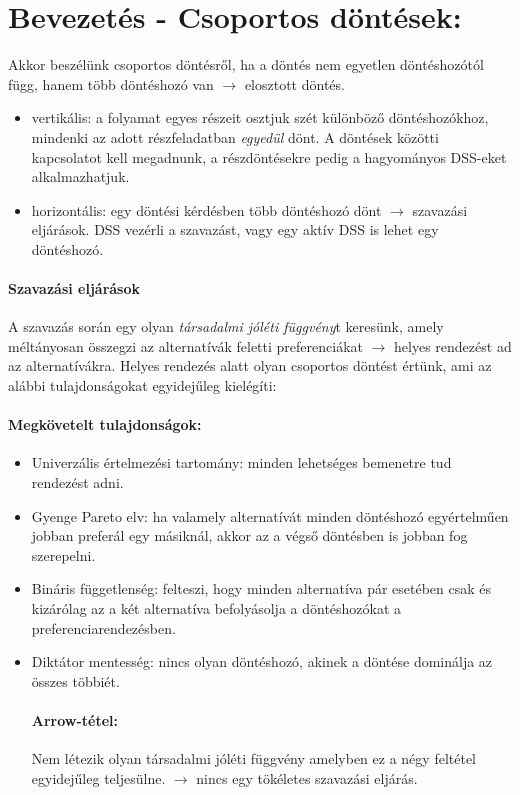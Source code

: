 \documentclass[a4paper,12pt]{article}
\begin{document}
\section{Bevezetés - Csoportos döntések:}

Akkor beszélünk csoportos döntésről, ha a döntés nem egyetlen döntéshozótól függ, hanem több döntéshozó van $\longrightarrow$ elosztott döntés.

\begin{itemize}
\item vertikális: a folyamat egyes részeit osztjuk szét különböző döntéshozókhoz, mindenki az adott részfeladatban \emph{egyedül} dönt. A döntések közötti kapcsolatot kell megadnunk, a részdöntésekre pedig a hagyományos DSS-eket alkalmazhatjuk.

\item horizontális: egy döntési kérdésben több döntéshozó dönt $\longrightarrow$ szavazási eljárások. DSS vezérli a szavazást, vagy egy aktív DSS is lehet egy döntéshozó. 
\end{itemize}

\paragraph{Szavazási eljárások}

A szavazás során egy olyan \emph{társadalmi jóléti függvény}t keresünk, amely méltányosan összegzi az alternatívák feletti preferenciákat $\longrightarrow$ helyes rendezést ad az alternatívákra. Helyes rendezés alatt olyan csoportos döntést értünk, ami az alábbi tulajdonságokat egyidejűleg kielégíti:

\paragraph{Megkövetelt tulajdonságok: }
\begin{itemize}
\item Univerzális értelmezési tartomány: minden lehetséges bemenetre tud rendezést adni.

\item Gyenge Pareto elv: ha valamely alternatívát minden döntéshozó egyértelműen jobban preferál egy másiknál, akkor az a végső döntésben is jobban fog szerepelni.

\item Bináris függetlenség: felteszi, hogy minden alternatíva pár esetében csak és kizárólag az a két alternatíva befolyásolja a döntéshozókat a preferenciarendezésben.

\item Diktátor mentesség: nincs olyan döntéshozó, akinek a döntése dominálja az összes többiét.

\paragraph{Arrow-tétel:}
Nem létezik olyan társadalmi jóléti függvény amelyben ez a négy feltétel egyidejűleg teljesülne. $\longrightarrow$ nincs egy tökéletes szavazási eljárás.

\end{itemize}
\end{document}
